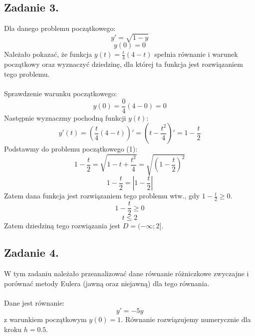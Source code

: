 \documentclass{article}
\begin{document}
\subsection{Zadanie 3.}
Dla danego problemu początkowego:
\begin{equation}
    y' = \sqrt{1-y}
\end{equation}
$$y(0) = 0$$
Należało pokazać, że funkcja $y(t) = \frac{t}{4}(4-t)$ spełnia równanie i warunek początkowy oraz wyznaczyć dziedzinę, dla której ta funkcja jest rozwiązaniem tego problemu.
\\\\
Sprawdzenie warunku początkowego:
$$y(0) = \frac{0}{4}(4-0) = 0$$
Następnie wyznaczmy pochodną funkcji $y(t)$:
$$y'(t) = (\frac{t}{4}(4-t))' = (t - \frac{t^2}{4})' = 1 - \frac{t}{2}$$
Podstawmy do problemu początkowego (1):
$$1-\frac{t}{2} = \sqrt{1 - t + \frac{t^2}{4}} = \sqrt{(1-\frac{t}{2})^2}$$
$$1-\frac{t}{2} = |1-\frac{t}{2}|$$
Zatem dana funkcja jest rozwiązaniem tego problemu wtw., gdy $1-\frac{t}{2} \geq 0$.
$$1-\frac{t}{2} \geq 0 $$
$$t \leq 2$$
Zatem dziedziną tego rozwiązania jest $D = (-\infty;2]$.

\subsection{Zadanie 4.}
W tym zadaniu należało przeanalizować dane równanie różniczkowe zwyczajne i porównać metody Eulera (jawną oraz niejawną) dla tego równania.
\\\\
Dane jest równanie:
\begin{equation}
    y' = -5y
\end{equation}
z warunkiem początkowym $y(0) = 1$. Równanie rozwiązujemy numerycznie dla kroku $h = 0.5$.
\end{document}
